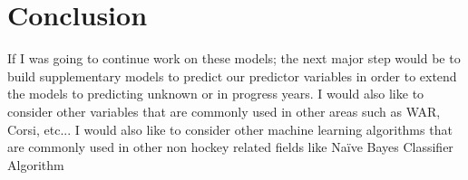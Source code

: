 \chapter{Conclusion}
If I was going to continue work on these models; the next major step would be to build supplementary models to predict our predictor variables in order to extend the models to predicting unknown or in progress years. I would also like to consider other variables that are commonly used in other areas such as WAR, Corsi, etc... I would also like to consider other machine learning algorithms that are commonly used in other non hockey related fields like Naïve Bayes Classifier Algorithm\cite{ML}  